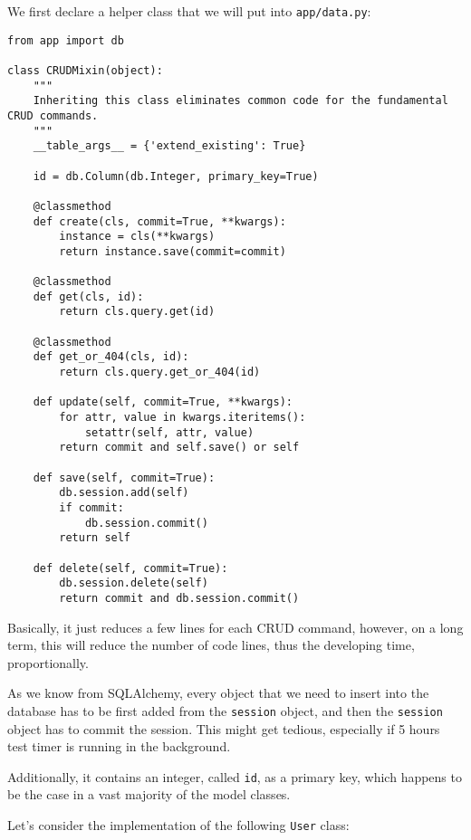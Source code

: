 \documentclass[../main/main.tex]{subfiles}
\begin{document}
We first declare a helper class that we will put into
\lstinline|app/data.py|: 

\begin{lstlisting}[caption=app/data.py, label=lst:data.py]
from app import db

class CRUDMixin(object):
    """
    Inheriting this class eliminates common code for the fundamental CRUD commands.
    """
    __table_args__ = {'extend_existing': True}

    id = db.Column(db.Integer, primary_key=True)

    @classmethod
    def create(cls, commit=True, **kwargs):
        instance = cls(**kwargs)
        return instance.save(commit=commit)

    @classmethod
    def get(cls, id):
        return cls.query.get(id)

    @classmethod
    def get_or_404(cls, id):
        return cls.query.get_or_404(id)

    def update(self, commit=True, **kwargs):
        for attr, value in kwargs.iteritems():
            setattr(self, attr, value)
        return commit and self.save() or self

    def save(self, commit=True):
        db.session.add(self)
        if commit:
            db.session.commit()
        return self

    def delete(self, commit=True):
        db.session.delete(self)
        return commit and db.session.commit()  
\end{lstlisting}

Basically, it just reduces a few lines for each CRUD command, however,
on a long term, this will reduce the number of code lines, thus the
developing time, proportionally. 

As we know from SQLAlchemy, every object that we need to insert into
the database has to be first added from the \lstinline|session|
object, and then the \lstinline|session| object has to commit the
session. This might get tedious, especially if 5 hours test timer is
running in the background.

Additionally, it contains an integer, called \lstinline|id|, as a
primary key, which happens to be the case in a vast majority of the
model classes.

Let's consider the implementation of the following \lstinline|User|
class: 
\end{document}
